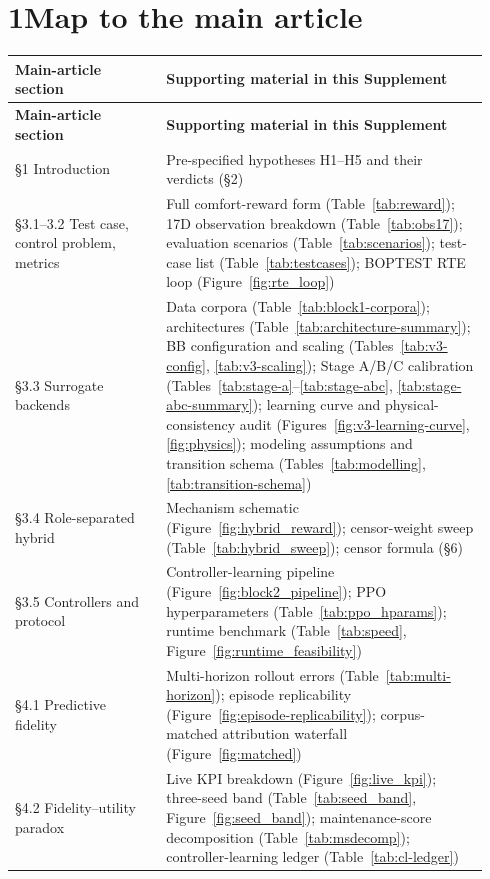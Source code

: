 \documentclass[11pt,a4paper]{article}
\begin{document}
\section*{1\quad Map to the main article}
\begin{longtable}{@{}p{0.30\linewidth}p{0.64\linewidth}@{}}
\toprule
\textbf{Main-article section} & \textbf{Supporting material in this Supplement} \\
\midrule
\endfirsthead
\textbf{Main-article section} & \textbf{Supporting material in this Supplement} \\
\midrule
\endhead
\S1 Introduction & Pre-specified hypotheses H1--H5 and their verdicts (\S2) \\
\S3.1--3.2 Test case, control problem, metrics & Full comfort-reward form (Table~\ref{tab:reward}); 17D observation breakdown (Table~\ref{tab:obs17}); evaluation scenarios (Table~\ref{tab:scenarios}); test-case list (Table~\ref{tab:testcases}); BOPTEST RTE loop (Figure~\ref{fig:rte_loop}) \\
\S3.3 Surrogate backends & Data corpora (Table~\ref{tab:block1-corpora}); architectures (Table~\ref{tab:architecture-summary}); BB configuration and scaling (Tables~\ref{tab:v3-config}, \ref{tab:v3-scaling}); Stage A/B/C calibration (Tables~\ref{tab:stage-a}--\ref{tab:stage-abc}, \ref{tab:stage-abc-summary}); learning curve and physical-consistency audit (Figures~\ref{fig:v3-learning-curve}, \ref{fig:physics}); modeling assumptions and transition schema (Tables~\ref{tab:modelling}, \ref{tab:transition-schema}) \\
\S3.4 Role-separated hybrid & Mechanism schematic (Figure~\ref{fig:hybrid_reward}); censor-weight sweep (Table~\ref{tab:hybrid_sweep}); censor formula (\S6) \\
\S3.5 Controllers and protocol & Controller-learning pipeline (Figure~\ref{fig:block2_pipeline}); PPO hyperparameters (Table~\ref{tab:ppo_hparams}); runtime benchmark (Table~\ref{tab:speed}, Figure~\ref{fig:runtime_feasibility}) \\
\S4.1 Predictive fidelity & Multi-horizon rollout errors (Table~\ref{tab:multi-horizon}); episode replicability (Figure~\ref{fig:episode-replicability}); corpus-matched attribution waterfall (Figure~\ref{fig:matched}) \\
\S4.2 Fidelity--utility paradox & Live KPI breakdown (Figure~\ref{fig:live_kpi}); three-seed band (Table~\ref{tab:seed_band}, Figure~\ref{fig:seed_band}); maintenance-score decomposition (Table~\ref{tab:msdecomp}); controller-learning ledger (Table~\ref{tab:cl-ledger}) \\

\end{longtable}
\end{document}
